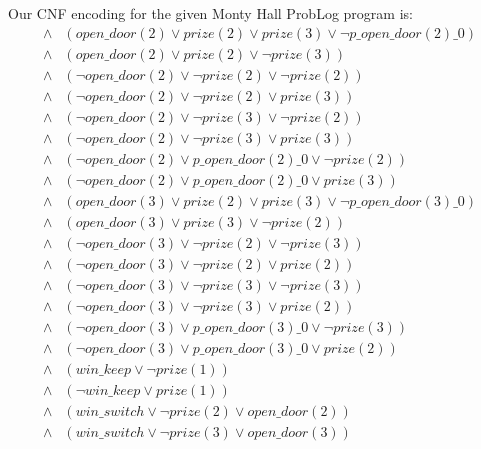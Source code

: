 Our CNF encoding for the given Monty Hall ProbLog program is:
\begin{align*}
    \land & (open\_door(2) \lor prize(2) \lor prize(3) \lor \neg p\_open\_door(2)\_0) \\
    \land & (open\_door(2) \lor prize(2) \lor \neg prize(3))                          \\
    \land & (\neg open\_door(2) \lor \neg prize(2) \lor \neg prize(2))                \\
    \land & (\neg open\_door(2) \lor \neg prize(2) \lor prize(3))                     \\
    \land & (\neg open\_door(2) \lor \neg prize(3) \lor \neg prize(2))                \\
    \land & (\neg open\_door(2) \lor \neg prize(3) \lor prize(3))                     \\
    \land & (\neg open\_door(2) \lor p\_open\_door(2)\_0 \lor \neg prize(2))          \\
    \land & (\neg open\_door(2) \lor p\_open\_door(2)\_0 \lor prize(3))               \\
    \land & (open\_door(3) \lor prize(2) \lor prize(3) \lor \neg p\_open\_door(3)\_0) \\
    \land & (open\_door(3) \lor prize(3) \lor \neg prize(2))                          \\
    \land & (\neg open\_door(3) \lor \neg prize(2) \lor \neg prize(3))                \\
    \land & (\neg open\_door(3) \lor \neg prize(2) \lor prize(2))                     \\
    \land & (\neg open\_door(3) \lor \neg prize(3) \lor \neg prize(3))                \\
    \land & (\neg open\_door(3) \lor \neg prize(3) \lor prize(2))                     \\
    \land & (\neg open\_door(3) \lor p\_open\_door(3)\_0 \lor \neg prize(3))          \\
    \land & (\neg open\_door(3) \lor p\_open\_door(3)\_0 \lor prize(2))               \\
    \land & (win\_keep \lor \neg prize(1))                                            \\
    \land & (\neg win\_keep \lor prize(1))                                            \\
    \land & (win\_switch \lor \neg prize(2) \lor open\_door(2))                       \\
    \land & (win\_switch \lor \neg prize(3) \lor open\_door(3))                       \\

\end{align*}
